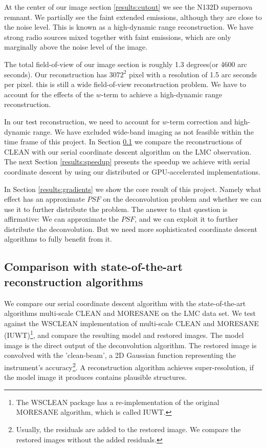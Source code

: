 At the center of our image section \ref{results:cutout} we see the N132D supernova remnant. We partially see the faint extended emissions, although they are close to the noise level. This is known as a high-dynamic range reconstruction. We have strong radio sources mixed together with faint emissions, which are only marginally above the noise level of the image.

The total field-of-view of our image section is roughly 1.3 degrees(or 4600 arc seconds). Our reconstruction has $3072^2$ pixel with a resolution of 1.5 arc seconds per pixel. this is still a wide field-of-view reconstruction problem. We have to account for the effects of the $w$-term to achieve a high-dynamic range reconstruction.

In our test reconstruction, we need to account for $w$-term correction and high-dynamic range. We have excluded wide-band imaging as not feasible within the time frame of this project. In Section \ref{results:cleancomp} we compare the reconstructions of CLEAN with our serial coordinate descent algorithm on the LMC observation. The next Section \ref{results:speedup} presents the speedup we achieve with serial coordinate descent by using our distributed or GPU-accelerated implementations.

In Section \ref{results:gradients} we show the core result of this project. Namely what effect has an approximate $PSF$ on the deconvolution problem and whether we can use it to further distribute the problem. The answer to that question is affirmative: We can approximate the $PSF$, and we can exploit it to further distribute the deconvolution. But we need more sophisticated coordinate descent algorithms to fully benefit from it.


\subsection{Comparison with state-of-the-art reconstruction algorithms} \label{results:cleancomp}
We compare our serial coordinate descent algorithm with the state-of-the-art algorithms multi-scale CLEAN and MORESANE on the LMC data set. We test against the WSCLEAN \cite{offringa2014wsclean} implementation of multi-scale CLEAN and MORESANE (IUWT)\footnote{The WSCLEAN package has a re-implementation of the original MORESANE algorithm\cite{dabbech2015moresane}, which is called IUWT.}, and compare the resulting model and restored images. The model image is the direct output of the deconvolution algorithm. The restored image is convolved with the 'clean-beam', a 2D Gaussian function representing the instrument's accuracy\footnote{Usually, the residuals are added to the restored image. We compare the restored images without the added residuals.}. A reconstruction algorithm achieves super-resolution, if the model image it produces contains plausible structures.


